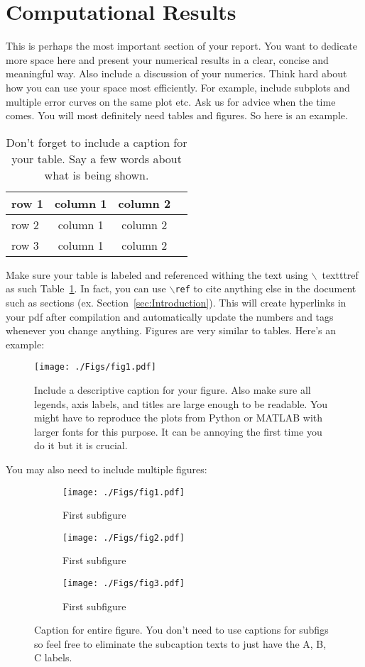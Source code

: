 \documentclass[11pt]{amsart}
\begin{document}
\section{Computational Results}\label{sec:results}
This is perhaps the most important section of your report. You want to dedicate
more space
here and present your numerical results in a clear, concise and meaningful way.
Also
include a discussion of your numerics. Think hard about how you can use
your space most efficiently. For example, include subplots and multiple error
curves on the
same plot etc. Ask us for advice when the time comes.
You will most definitely need tables and figures. So here is an example.
\begin{table}[htp]
\centering
\begin{tabular}{| l | c|c | r |}
\hline
row 1 & column 1 & column 2 \\ \hline
row 2 & column 1 & column 2 \\
row 3 & column 1 & column 2 \\ \hline
\end{tabular}
\caption{Don't forget to include a caption for your table. Say a few words
about what is
being shown.}
\label{tab:meaningful-label}
\end{table}
Make sure your table is labeled and referenced withing the text using $\backslash$\
texttt{ref} as such Table~\ref{tab:meaningful-label}. In fact, you can
use $\backslash$\texttt{ref} to cite anything else in the document such as
sections (ex. Section~\ref{sec:Introduction}). This will create hyperlinks in your
pdf after compilation and automatically update the numbers and tags whenever you
change
anything.
Figures are very similar to tables. Here's an example:
\begin{figure}[htp]
\centering
\texttt{[image: ./Figs/fig1.pdf]}
\caption{Include a descriptive caption for your figure. Also make sure all
legends, axis labels, and titles are large enough to be readable. You might
have
to reproduce the plots from Python or MATLAB with larger fonts for this
purpose. It
can be annoying the first time you do it but it is crucial.}
\label{fig:meaningful-label}
\end{figure}
You may also need to include multiple figures:
\begin{figure}
\centering
\begin{subfigure}[b]{.3\textwidth}
\texttt{[image: ./Figs/fig1.pdf]}
\caption{First subfigure}
\label{subfig:first}
\end{subfigure}
\begin{subfigure}[b]{.3\textwidth}
\texttt{[image: ./Figs/fig2.pdf]}
\caption{First subfigure}
\label{subfig:second}
\end{subfigure}
\begin{subfigure}[b]{.3\textwidth}
\texttt{[image: ./Figs/fig3.pdf]}
\caption{First subfigure}
\label{subfig:third}
\end{subfigure}
\caption{Caption for entire figure. You don't need to use captions for subfigs
so
feel free to eliminate the subcaption texts to just have the A, B, C labels.}
\label{fig:meaningful-label-2}
\end{figure}
\end{document}
